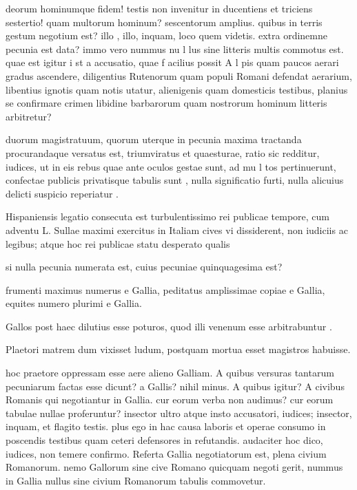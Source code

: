  deorum hominumque fidem! testis non invenitur in ducentiens et triciens sestertio! quam multorum hominum? sescentorum amplius. quibus in terris gestum negotium est? illo , illo, inquam, loco quem videtis. extra ordinemne pecunia est data? immo vero nummus nu l lus sine litteris multis commotus est. quae est igitur i st a accusatio, quae f acilius possit A l pis quam paucos aerari gradus ascendere, diligentius Rutenorum quam populi Romani defendat aerarium, libentius ignotis quam notis utatur, alienigenis quam domesticis testibus, planius se confirmare crimen libidine barbarorum quam nostrorum hominum litteris arbitretur?

 duorum magistratuum, quorum uterque in pecunia maxima tractanda procurandaque versatus est, triumviratus et quaesturae, ratio sic redditur, iudices, ut in eis rebus quae ante oculos gestae sunt, ad mu l tos pertinuerunt, confectae publicis privatisque tabulis sunt , nulla significatio furti, nulla alicuius delicti suspicio reperiatur .

 Hispaniensis legatio consecuta est turbulentissimo rei publicae tempore, cum adventu L. Sullae maximi exercitus in Italiam cives vi dissiderent, non iudiciis ac legibus; atque hoc rei publicae statu desperato qualis

 si nulla pecunia numerata est, cuius pecuniae quinquagesima est?

 frumenti maximus numerus e Gallia, peditatus amplissimae copiae e Gallia, equites numero plurimi e Gallia.

 Gallos post haec dilutius esse poturos, quod illi venenum esse arbitrabuntur .

 Plaetori matrem dum vixisset ludum, postquam mortua esset magistros habuisse.

 hoc praetore oppressam esse aere alieno Galliam. A quibus versuras tantarum pecuniarum factas esse dicunt? a Gallis? nihil minus. A quibus igitur? A civibus Romanis qui negotiantur in Gallia. cur eorum verba non audimus? cur eorum tabulae nullae proferuntur? insector ultro atque insto accusatori, iudices; insector, inquam, et flagito testis. plus ego in hac causa laboris et operae consumo in poscendis testibus quam ceteri defensores in refutandis. audaciter hoc dico, iudices, non temere confirmo. Referta Gallia negotiatorum est, plena civium Romanorum. nemo Gallorum sine cive Romano quicquam negoti gerit, nummus in Gallia nullus sine civium Romanorum tabulis commovetur.

